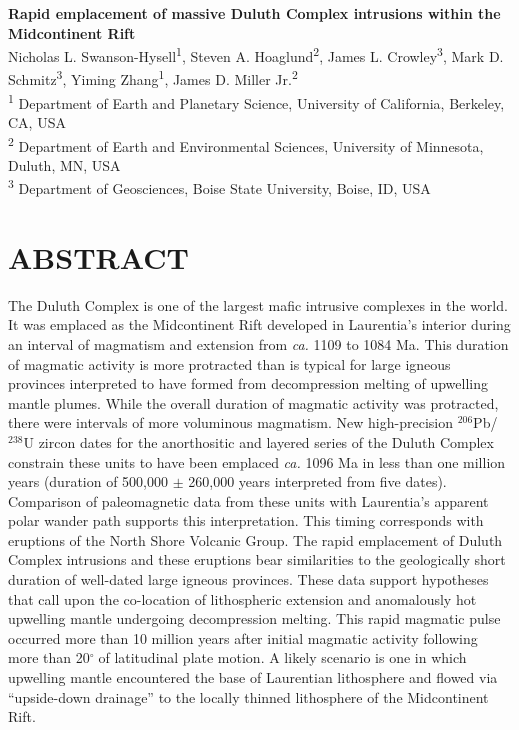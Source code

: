 \documentclass[11pt,letterpaper]{article}
\begin{document}
\begin{flushleft}
{\Large \textbf{Rapid emplacement of massive Duluth Complex intrusions within the Midcontinent Rift}}
\\
Nicholas L. Swanson-Hysell\textsuperscript{1}, Steven A. Hoaglund\textsuperscript{2}, James L. Crowley\textsuperscript{3}, Mark D. Schmitz\textsuperscript{3}, Yiming Zhang\textsuperscript{1}, James D. Miller Jr.\textsuperscript{2}
\\
\bigskip
\textsuperscript{1} Department of Earth and Planetary Science, University of California, Berkeley, CA, USA\\
\textsuperscript{2} Department of Earth and Environmental Sciences, University of Minnesota, Duluth, MN, USA \\
\textsuperscript{3} Department of Geosciences, Boise State University, Boise, ID, USA
\bigskip
\end{flushleft}

\linenumbers

\section*{ABSTRACT}

The Duluth Complex is one of the largest mafic intrusive complexes in the world. It was emplaced as the Midcontinent Rift developed in Laurentia's interior during an interval of magmatism and extension from \textit{ca.} 1109 to 1084 Ma. This duration of magmatic activity is more protracted than is typical for large igneous provinces interpreted to have formed from decompression melting of upwelling mantle plumes. While the overall duration of magmatic activity was protracted, there were intervals of more voluminous magmatism. New high-precision $^{206}$Pb/$^{238}$U zircon dates for the anorthositic and layered series of the Duluth Complex constrain these units to have been emplaced \textit{ca.} 1096 Ma in less than one million years (duration of 500,000 $\pm$ 260,000 years interpreted from five dates). Comparison of paleomagnetic data from these units with Laurentia's apparent polar wander path supports this interpretation. This timing corresponds with eruptions of the North Shore Volcanic Group. The rapid emplacement of Duluth Complex intrusions and these eruptions bear similarities to the geologically short duration of well-dated large igneous provinces. These data support hypotheses that call upon the co-location of lithospheric extension and anomalously hot upwelling mantle undergoing decompression melting. This rapid magmatic pulse occurred more than 10 million years after initial magmatic activity following more than 20$^{\circ}$$\;$of latitudinal plate motion. A likely scenario is one in which upwelling mantle encountered the base of Laurentian lithosphere and flowed via ``upside-down drainage'' to the locally thinned lithosphere of the Midcontinent Rift.
\end{document}
